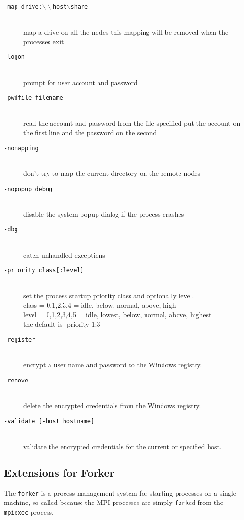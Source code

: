 \documentclass[dvipdfm,11pt]{article}
\begin{document}
\begin{description}
\item[\texttt{-map drive:$\backslash\backslash$host$\backslash$share}]\mbox{}\\
  map a drive on all the nodes
  this mapping will be removed when the processes exit
\item[\texttt{-logon}]\mbox{}\\
  prompt for user account and password
\item[\texttt{-pwdfile filename}]\mbox{}\\
  read the account and password from the file specified
  put the account on the first line and the password on the second
\item[\texttt{-nomapping}]\mbox{}\\
  don't try to map the current directory on the remote nodes
\item[\texttt{-nopopup\_debug}]\mbox{}\\
  disable the system popup dialog if the process crashes
\item[\texttt{-dbg}]\mbox{}\\
  catch unhandled exceptions
\item[\texttt{-priority class[:level]}]\mbox{}\\
  set the process startup priority class and optionally level.\mbox{}\\
  class = 0,1,2,3,4   = idle, below, normal, above, high\mbox{}\\
  level = 0,1,2,3,4,5 = idle, lowest, below, normal, above, highest\mbox{}\\
  the default is -priority 1:3
\item[\texttt{-register}]\mbox{}\\
  encrypt a user name and password to the Windows registry.
\item[\texttt{-remove}]\mbox{}\\
  delete the encrypted credentials from the Windows registry.
\item[\texttt{-validate [-host hostname]}]\mbox{}\\
  validate the encrypted credentials for the current or specified host.
\end{description}


\subsection{Extensions for Forker}
\label{sec:extensions-forker}
The \texttt{forker} is a process management system for starting
processes on a single machine, so called because the MPI processes are
simply \texttt{fork}ed from the \texttt{mpiexec} process.
\end{document}
